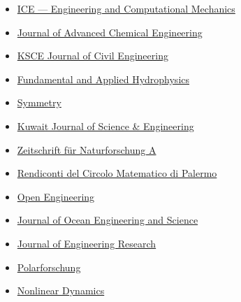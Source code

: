 \begin{itemize}
    \item[$\blacktriangleright$] \href{http://www.icevirtuallibrary.com/content/serial/eacm/}%
    {ICE --- Engineering and Computational Mechanics}
    
    \item[$\blacktriangleright$] \href{http://www.ashdin.com/journals/jace/jace.aspx}%
    {Journal of Advanced Chemical Engineering}
    
    \item[$\blacktriangleright$] \href{http://www.springer.com/engineering/civil+engineering/journal/12205}%
    {KSCE Journal of Civil Engineering}
    
    \item[$\blacktriangleright$] \href{http://hydrophysics.info/?lang=en}%
    {Fundamental and Applied Hydrophysics}
    
    \item[$\blacktriangleright$] \href{http://www.mdpi.com/journal/symmetry}%
    {Symmetry}
    
    \item[$\blacktriangleright$] \href{http://pubcouncil.kuniv.edu.kw/kjs/}%
    {Kuwait Journal of Science \& Engineering}
    
    \item[$\blacktriangleright$] \href{http://www.degruyter.com/view/j/zna}%
    {Zeitschrift f\"ur Naturforschung A}
    
    \item[$\blacktriangleright$] \href{http://www.springer.com/mathematics/journal/12215}%
    {Rendiconti del Circolo Matematico di Palermo }
    
    \item[$\blacktriangleright$] \href{https://www.degruyter.com/view/j/eng}%
    {Open Engineering}

    \item[$\blacktriangleright$] \href{https://www.sciencedirect.com/journal/journal-of-ocean-engineering-and-science/}%
    {Journal of Ocean Engineering and Science}

    \item[$\blacktriangleright$] \href{https://www.sciencedirect.com/journal/journal-of-engineering-research/}%
    {Journal of Engineering Research}
    
    \item[$\blacktriangleright$] \href{http://www.polarforschung.de/}%
    {Polarforschung}
    
    \item[$\blacktriangleright$] \href{https://link.springer.com/journal/11071}%
    {Nonlinear Dynamics}


\end{itemize}
